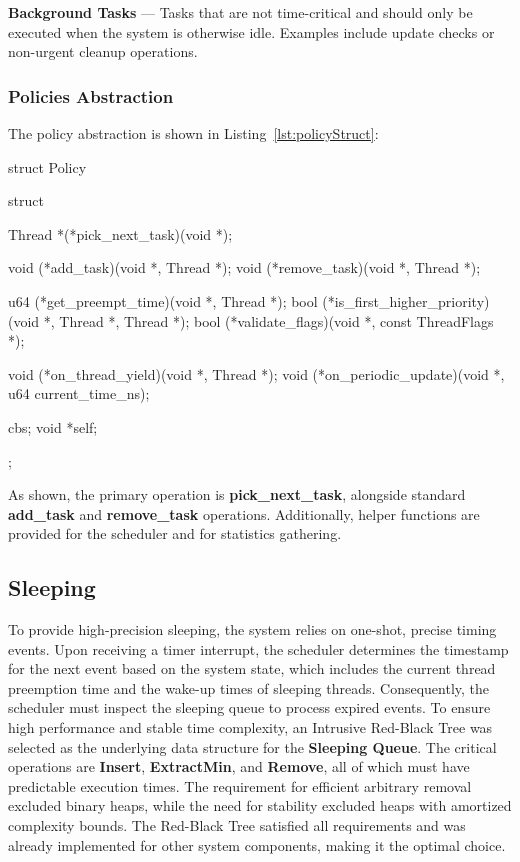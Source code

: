 \documentclass[a4paper,10pt,twoside]{report}
\theoremstyle{definition}
\begin{document}
\textbf{Background Tasks} --- Tasks that are not time-critical and should only be executed when the system is otherwise idle. Examples include update checks or non-urgent cleanup operations.

\clearpage

\subsubsection{Policies Abstraction}
\label{subsec:policies}

The policy abstraction is shown in Listing~\ref{lst:policyStruct}:

\begin{cppcode}[caption={Policy Abstraction}, label={lst:policyStruct}]
struct Policy {
    struct {
        Thread *(*pick_next_task)(void *);

        void (*add_task)(void *, Thread *);
        void (*remove_task)(void *, Thread *);

        u64 (*get_preempt_time)(void *, Thread *);
        bool (*is_first_higher_priority)(void *, Thread *, Thread *);
        bool (*validate_flags)(void *, const ThreadFlags *);

        void (*on_thread_yield)(void *, Thread *);
        void (*on_periodic_update)(void *, u64 current_time_ns);
    } cbs;
    void *self;
};
\end{cppcode}

As shown, the primary operation is \textbf{pick\_next\_task}, alongside standard \textbf{add\_task} and \textbf{remove\_task} operations. Additionally, helper functions are provided for the scheduler and for statistics gathering.

\subsection{Sleeping}

To provide high-precision sleeping, the system relies on one-shot, precise timing events. Upon receiving a timer interrupt, the scheduler determines the timestamp for the next event based on the system state, which includes the current thread preemption time and the wake-up times of sleeping threads. Consequently, the scheduler must inspect the sleeping queue to process expired events. To ensure high performance and stable time complexity, an Intrusive Red-Black Tree was selected as the underlying data structure for the \textbf{Sleeping Queue}. The critical operations are \textbf{Insert}, \textbf{ExtractMin}, and \textbf{Remove}, all of which must have predictable execution times. The requirement for efficient arbitrary removal excluded binary heaps, while the need for stability excluded heaps with amortized complexity bounds. The Red-Black Tree satisfied all requirements and was already implemented for other system components, making it the optimal choice.
\end{document}
